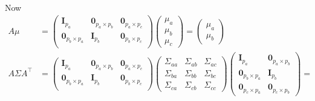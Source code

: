 \documentclass[10pt,notitlepage]{article}
\newcommand{\Id}{\mathbf{I}}
\newcommand{\ZeroM}{\mathbf{0}}
\begin{document}
\begin{exercise}[Solution]
\begin{enumerate}[(a)]
\begin{align*}
                    \end{align*}
                    Now
                    \begin{align*}
                        A\mu &=
                        \begin{pmatrix}
                            \Id_{p_a} & \ZeroM_{p_a\times p_b} & \ZeroM_{p_a\times p_c}\\
                            \ZeroM_{p_b\times p_a} & \Id_{p_b} & \ZeroM_{p_b\times p_c}\\
                        \end{pmatrix}
                        \begin{pmatrix}
                            \mu_a\\
                            \mu_b\\
                            \mu_c
                        \end{pmatrix} = 
                        \begin{pmatrix}
                            \mu_a\\
                            \mu_b
                        \end{pmatrix}\\
                        A\Sigma A^\top &= 
                        \begin{pmatrix}
                            \Id_{p_a} & \ZeroM_{p_a\times p_b} & \ZeroM_{p_a\times p_c}\\
                            \ZeroM_{p_b\times p_a} & \Id_{p_b} & \ZeroM_{p_b\times p_c}\\
                        \end{pmatrix}
                        \begin{pmatrix}
                            \Sigma_{aa} & \Sigma_{ab} & \Sigma_{ac}\\
                            \Sigma_{ba} & \Sigma_{bb} & \Sigma_{bc}\\
                            \Sigma_{ca} & \Sigma_{cb} & \Sigma_{cc}
                        \end{pmatrix}
                        \begin{pmatrix}
                            \Id_{p_a} & \ZeroM_{p_a\times p_b} \\
                            \ZeroM_{p_b\times p_a} & \Id_{p_b}\\
                            \ZeroM_{p_c\times p_a} & \ZeroM_{p_c\times p_b}
                        \end{pmatrix} = \\

\end{align*}
\end{enumerate}
\end{exercise}
\end{document}
